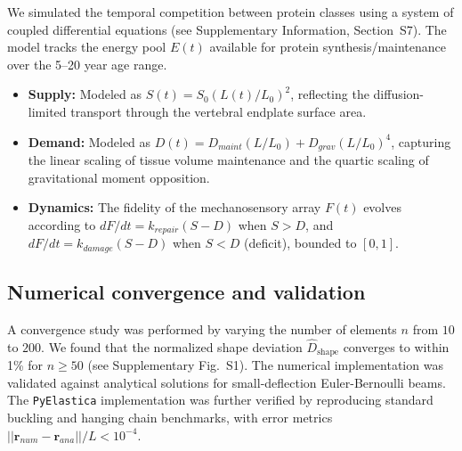 \documentclass[11pt]{article}
\begin{document}
We simulated the temporal competition between protein classes using a system of coupled differential equations (see Supplementary Information, Section~S7). The model tracks the energy pool $E(t)$ available for protein synthesis/maintenance over the 5--20 year age range.
\begin{itemize}
    \item \textbf{Supply:} Modeled as $S(t) = S_0 (L(t)/L_0)^2$, reflecting the diffusion-limited transport through the vertebral endplate surface area.
    \item \textbf{Demand:} Modeled as $D(t) = D_{maint} (L/L_0) + D_{grav} (L/L_0)^4$, capturing the linear scaling of tissue volume maintenance and the quartic scaling of gravitational moment opposition.
    \item \textbf{Dynamics:} The fidelity of the mechanosensory array $F(t)$ evolves according to $dF/dt = k_{repair}(S - D)$ when $S > D$, and $dF/dt = k_{damage}(S - D)$ when $S < D$ (deficit), bounded to $[0, 1]$.
\end{itemize}

\subsection{Numerical convergence and validation}

A convergence study was performed by varying the number of elements $n$ from $10$ to $200$. We found that the normalized shape deviation $\widehat{D}_{\mathrm{shape}}$ converges to within 1\% for $n \geq 50$ (see Supplementary Fig.~S1). The numerical implementation was validated against analytical solutions for small-deflection Euler-Bernoulli beams. The \texttt{PyElastica} implementation was further verified by reproducing standard buckling and hanging chain benchmarks, with error metrics $||\mathbf{r}_{num} - \mathbf{r}_{ana}||/L < 10^{-4}$.








\end{document}

